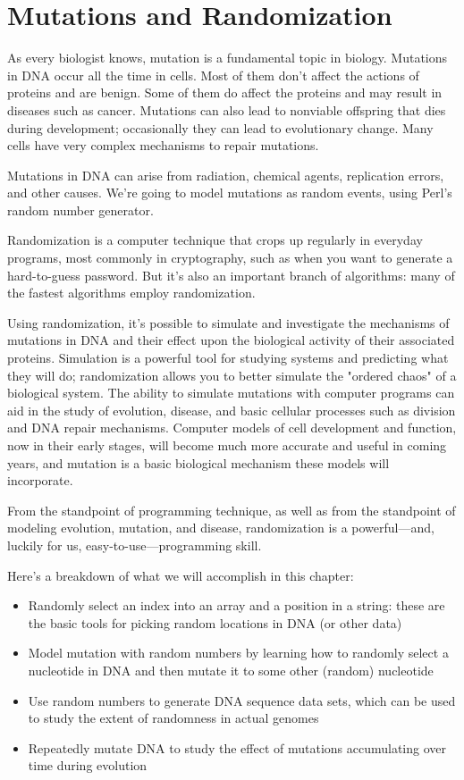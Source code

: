 \chapter{Mutations and Randomization}
\label{chap:chapter7}
\minitoc

As every biologist knows, mutation is a fundamental topic in biology.  Mutations in DNA occur all the time in cells. Most of them don't affect the actions of proteins and are benign. Some of them do affect the proteins and may result in diseases such as cancer. Mutations can also lead to nonviable offspring that dies during development; occasionally they can lead to evolutionary change. Many cells have very complex mechanisms to repair mutations.

Mutations in DNA can arise from radiation, chemical agents, replication errors, and other causes. We're going to model mutations as random events, using Perl's random number generator.

Randomization is a computer technique that crops up regularly in everyday programs, most commonly in cryptography, such as when you want to generate a hard-to-guess password. But it's also an important branch of algorithms: many of the fastest algorithms employ randomization.

Using randomization, it's possible to simulate and investigate the mechanisms of mutations in DNA and their effect upon the biological activity of their associated proteins. Simulation is a powerful tool for studying systems and predicting what they will do; randomization allows you to better simulate the "ordered chaos" of a biological system. The ability to simulate mutations with computer programs can aid in the study of evolution, disease, and basic cellular processes such as division and DNA repair mechanisms. Computer models of cell development and function, now in their early stages, will become much more accurate and useful in coming years, and mutation is a basic biological mechanism these models will incorporate.

From the standpoint of programming technique, as well as from the standpoint of modeling evolution, mutation, and disease, randomization is a powerful—and, luckily for us, easy-to-use—programming skill.

Here's a breakdown of what we will accomplish in this chapter:

\begin{itemize}
  \item Randomly select an index into an array and a position in a string: these are the basic tools for picking random locations in DNA (or other data)
  \item Model mutation with random numbers by learning how to randomly select a nucleotide in DNA and then mutate it to some other (random) nucleotide
  \item Use random numbers to generate DNA sequence data sets, which can be used to study the extent of randomness in actual genomes
  \item Repeatedly mutate DNA to study the effect of mutations accumulating over time during evolution
\end{itemize}

